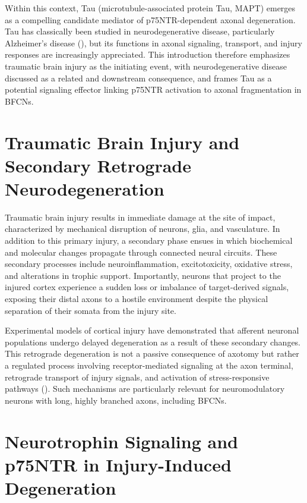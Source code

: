 \documentclass[
  letterpaper,
  DIV=11,
  numbers=noendperiod]{scrreprt}
\begin{document}
Within this context, Tau (microtubule-associated protein Tau, MAPT)
emerges as a compelling candidate mediator of p75NTR-dependent axonal
degeneration. Tau has classically been studied in neurodegenerative
disease, particularly Alzheimer's disease (), but its functions in axonal signaling, transport, and injury
responses are increasingly appreciated. This introduction therefore
emphasizes traumatic brain injury as the initiating event, with
neurodegenerative disease discussed as a related and downstream
consequence, and frames Tau as a potential signaling effector linking
p75NTR activation to axonal fragmentation in BFCNs.

\section{Traumatic Brain Injury and Secondary Retrograde
Neurodegeneration}\label{traumatic-brain-injury-and-secondary-retrograde-neurodegeneration}

Traumatic brain injury results in immediate damage at the site of
impact, characterized by mechanical disruption of neurons, glia, and
vasculature. In addition to this primary injury, a secondary phase
ensues in which biochemical and molecular changes propagate through
connected neural circuits. These secondary processes include
neuroinflammation, excitotoxicity, oxidative stress, and alterations in
trophic support. Importantly, neurons that project to the injured cortex
experience a sudden loss or imbalance of target-derived signals,
exposing their distal axons to a hostile environment despite the
physical separation of their somata from the injury site.

Experimental models of cortical injury have demonstrated that afferent
neuronal populations undergo delayed degeneration as a result of these
secondary changes. This retrograde degeneration is not a passive
consequence of axotomy but rather a regulated process involving
receptor-mediated signaling at the axon terminal, retrograde transport
of injury signals, and activation of stress-responsive pathways
(). Such mechanisms are particularly relevant for neuromodulatory
neurons with long, highly branched axons, including BFCNs.

\section{Neurotrophin Signaling and p75NTR in Injury-Induced
Degeneration}\label{neurotrophin-signaling-and-p75ntr-in-injury-induced-degeneration}
\end{document}
